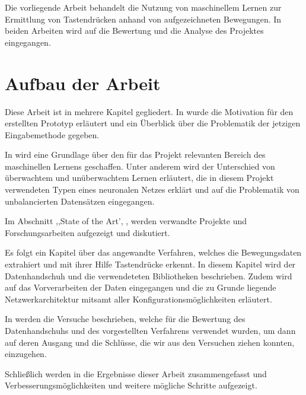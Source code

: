 Die vorliegende Arbeit behandelt die Nutzung von maschinellem Lernen zur Ermittlung von Tastendrücken anhand von aufgezeichneten Bewegungen. In beiden Arbeiten wird auf die Bewertung und die Analyse des Projektes eingegangen.

\section{Aufbau der Arbeit}
Diese Arbeit ist in mehrere Kapitel gegliedert. In  wurde die Motivation für den erstellten Prototyp erläutert und ein Überblick über die Problematik der jetzigen Eingabemethode gegeben.

In  wird eine Grundlage über den für das Projekt relevanten Bereich des maschinellen Lernens geschaffen. Unter anderem wird der Unterschied von überwachtem und unüberwachtem Lernen erläutert, die in diesem Projekt verwendeten Typen eines neuronalen Netzes erklärt und auf die Problematik von unbalancierten Datensätzen eingegangen.

Im  Abschnitt ,,State of the Art', , werden verwandte Projekte und Forschungsarbeiten aufgezeigt und diskutiert.

Es folgt ein Kapitel über das angewandte Verfahren, welches die Bewegungsdaten extrahiert und mit ihrer Hilfe Tastendrücke erkennt. In diesem Kapitel wird der Datenhandschuh und die verwendeteten Bibliotheken beschrieben.  Zudem wird auf das Vorverarbeiten der Daten eingegangen und die zu Grunde liegende Netzwerkarchitektur mitsamt aller Kon\-fi\-gu\-ra\-tions\-mög\-lich\-kei\-ten erläutert.

In  werden die Versuche beschrieben, welche für die Bewertung des Daten\-hand\-schuhs und des vorgestellten Verfahrens verwendet wurden, um dann auf deren Ausgang und die Schlüsse, die wir aus den Versuchen ziehen konnten, einzugehen.

Schließlich werden in  die Ergebnisse dieser Arbeit zusammengefasst und Verbesserungsmöglichkeiten und weitere mögliche Schritte aufgezeigt.



